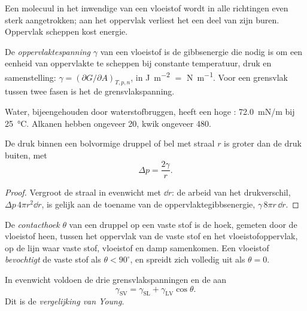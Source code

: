 Een molecuul in het inwendige van een vloeistof wordt in alle richtingen
even sterk aangetrokken; aan het oppervlak verliest het een deel van zijn
buren. Oppervlak scheppen kost energie.

\begin{definition}[Oppervlaktespanning]\label{def:b3:colloids:surface-tension}
De \emph{oppervlaktespanning} $\gamma$ van een
vloeistof is de gibbsenergie die nodig is om een eenheid van oppervlakte
te scheppen bij constante temperatuur, druk en samenstelling: $\gamma = (\partial G/\partial A)_{T,p,n}$, in \unit{J.m^{-2}} $=$ \unit{N.m^{-1}}. Voor
een grensvlak tussen twee fasen is het de grensvlakspanning.
\end{definition}

Water, bijeengehouden door waterstofbruggen, heeft een hoge
: \qty{72.0}{mN/m}
bij \qty{25}{\celsius}. Alkanen hebben ongeveer 20, kwik ongeveer 480.

\begin{proposition}\label{prop:b3:colloids:laplace}
De druk binnen een bolvormige druppel of bel met straal $r$ is groter dan
de druk buiten, met
\[
  \Delta p = \frac{2\gamma}{r} .
\]
\end{proposition}

\begin{proof}
Vergroot de straal in evenwicht met $\dd r$: de arbeid van het
drukverschil, $\Delta p\,4\pi r^2\dd r$, is gelijk aan de toename van de oppervlaktegibbsenergie, $\gamma\,8\pi r\,\dd r$.
\end{proof}

\begin{definition}\label{def:b3:colloids:wetting}
De \emph{contacthoek} $\theta$ van een druppel op een
vaste stof is de hoek, gemeten door de vloeistof heen, tussen het
oppervlak van de vaste stof en het vloeistofoppervlak, op de lijn waar
vaste stof, vloeistof en damp samenkomen. Een vloeistof
\emph{bevochtigt} de vaste stof als $\theta < 90^\circ$, en spreidt zich volledig uit als $\theta = 0$.
\end{definition}

\begin{theorem}\label{thm:b3:colloids:young}
In evenwicht voldoen de drie grensvlakspanningen en de  aan
\[
  \gamma_{\mathrm{SV}} = \gamma_{\mathrm{SL}} + \gamma_{\mathrm{LV}}\cos\theta .
\]
Dit is de \emph{vergelijking van Young}.
\end{theorem}

